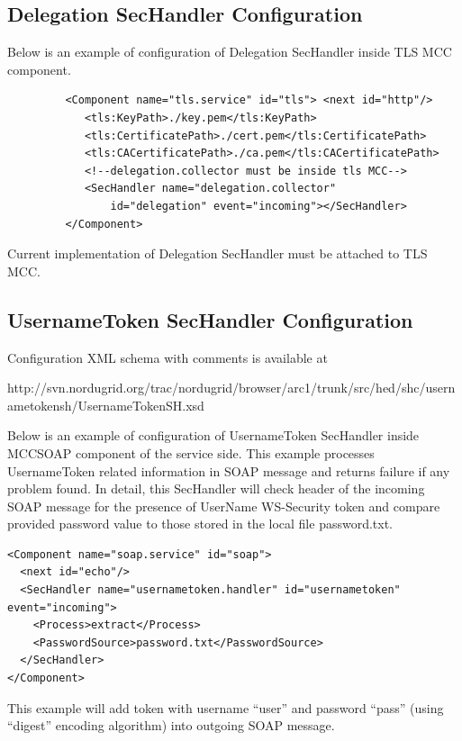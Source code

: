 \documentclass{article}                            %
\begin{document}
\subsection{Delegation SecHandler Configuration} %
\label{subsec:deleg_sechandler_conf}
Below is an example of configuration of Delegation SecHandler inside TLS MCC component.

\begin{verbatim}
         <Component name="tls.service" id="tls"> <next id="http"/>
            <tls:KeyPath>./key.pem</tls:KeyPath>
            <tls:CertificatePath>./cert.pem</tls:CertificatePath>
            <tls:CACertificatePath>./ca.pem</tls:CACertificatePath>
            <!--delegation.collector must be inside tls MCC-->
            <SecHandler name="delegation.collector" 
                id="delegation" event="incoming"></SecHandler>
         </Component>
\end{verbatim}

Current implementation of Delegation SecHandler must be attached to TLS MCC. 


\subsection{UsernameToken SecHandler Configuration} %
\label{subsec:ut_sechandler_conf}
Configuration XML schema with comments is available at 

http://svn.nordugrid.org/trac/nordugrid/browser/arc1/trunk/src/hed/shc/usernametokensh/UsernameTokenSH.xsd

Below is an example of configuration of UsernameToken SecHandler inside MCCSOAP component of the service side. This example processes UsernameToken related information in SOAP message and returns failure if any problem found. In detail, this SecHandler will check header of the incoming SOAP message for the presence of UserName WS-Security token and compare provided password value to those stored in the local file password.txt.

\begin{verbatim}
<Component name="soap.service" id="soap">
  <next id="echo"/>
  <SecHandler name="usernametoken.handler" id="usernametoken" event="incoming">
    <Process>extract</Process>
    <PasswordSource>password.txt</PasswordSource>
  </SecHandler>
</Component>
\end{verbatim}

This example will add token with username ``user'' and password ``pass'' (using ``digest'' encoding algorithm) into outgoing SOAP message.
\end{document}
